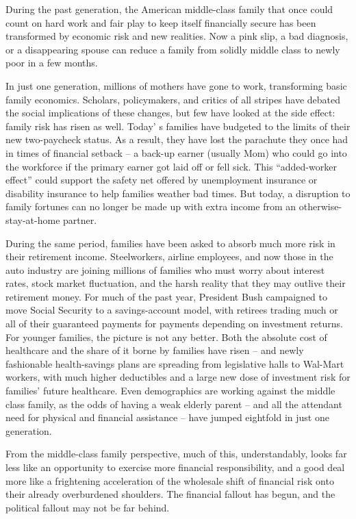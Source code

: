 During the past generation, the American middle-class family that once could count on hard work and fair play to keep itself financially secure has been transformed by economic risk and new realities. Now a pink slip, a bad diagnosis, or a disappearing spouse can reduce a family from solidly middle class to newly poor in a few months.


In just one generation, millions of mothers have gone to work, transforming basic family economics. Scholars, policymakers, and critics of all stripes have debated the social implications of these changes, but few have looked at the side effect: family risk has risen as well. Today' s families have budgeted to the limits of their new two-paycheck status. As a result, they have lost the parachute they once had in times of financial setback – a back-up earner (usually Mom) who could go into the workforce if the primary earner got laid off or fell sick. This ``added-worker effect'' could support the safety net offered by unemployment insurance or disability insurance to help families weather bad times. But today, a disruption to family fortunes can no longer be made up with extra income from an otherwise-stay-at-home partner.


During the same period, families have been asked to absorb much more risk in their retirement income. Steelworkers, airline employees, and now those in the auto industry are joining millions of families who must worry about interest rates, stock market fluctuation, and the harsh reality that they may outlive their retirement money. For much of the past year, President Bush campaigned to move Social Security to a savings-account model, with retirees trading much or all of their guaranteed payments for payments depending on investment returns. For younger families, the picture is not any better. Both the absolute cost of healthcare and the share of it borne by families have risen – and newly fashionable health-savings plans are spreading from legislative halls to Wal-Mart workers, with much higher deductibles and a large new dose of investment risk for families' future healthcare. Even demographics are working against the middle class family, as the odds of having a weak elderly parent – and all the attendant need for physical and financial assistance – have jumped eightfold in just one generation.


From the middle-class family perspective, much of this, understandably, looks far less like an opportunity to exercise more financial responsibility, and a good deal more like a frightening acceleration of the wholesale shift of financial risk onto their already overburdened shoulders. The financial fallout has begun, and the political fallout may not be far behind.